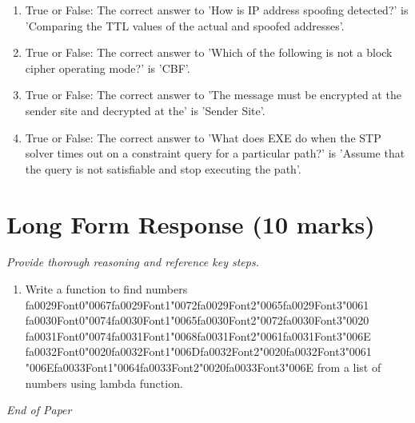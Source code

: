 \documentclass[12pt]{article}
\begin{document}
\begin{enumerate}[label=\arabic*.]
\item True or False: The correct answer to 'How is IP address spoofing detected?' is 'Comparing the TTL values of the actual and spoofed addresses'.
\item True or False: The correct answer to 'Which of the following is not a block cipher operating mode?' is 'CBF'.
\item True or False: The correct answer to 'The message must be encrypted at the sender site and decrypted at the' is 'Sender Site'.
\item True or False: The correct answer to 'What does EXE do when the STP solver times out on a constraint query for a particular path?' is 'Assume that the query is not satisfiable and stop executing the path'.
\end{enumerate}

\section*{Long Form Response (10 marks)}
\textit{Provide thorough reasoning and reference key steps.}
\begin{enumerate}[label=\arabic*.]
\item Write a function to find numbers {\csname fa0029Font0\endcsname\char"0067}{\csname fa0029Font1\endcsname\char"0072}{\csname fa0029Font2\endcsname\char"0065}{\csname fa0029Font3\endcsname\char"0061} {\csname fa0030Font0\endcsname\char"0074}{\csname fa0030Font1\endcsname\char"0065}{\csname fa0030Font2\endcsname\char"0072}{\csname fa0030Font3\endcsname\char"0020} {\csname fa0031Font0\endcsname\char"0074}{\csname fa0031Font1\endcsname\char"0068}{\csname fa0031Font2\endcsname\char"0061}{\csname fa0031Font3\endcsname\char"006E} {\csname fa0032Font0\endcsname\char"0020}{\csname fa0032Font1\endcsname\char"006D}{\csname fa0032Font2\endcsname\char"0020}{\csname fa0032Font3\endcsname\char"0061} {\char"006E}{\csname fa0033Font1\endcsname\char"0064}{\csname fa0033Font2\endcsname\char"0020}{\csname fa0033Font3\endcsname\char"006E} from a list of numbers using lambda
function.
\end{enumerate}

\vfill
\noindent\textit{End of Paper}
\end{document}
